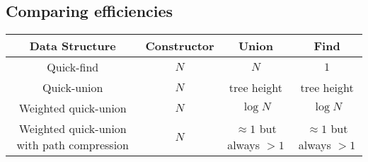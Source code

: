 \documentclass{article}
\begin{document}
\subsection{Comparing efficiencies}
\begin{center}
\begin{tabular}{||c c c c||} 
 \hline
 Data Structure & Constructor & Union & Find \\ [0.5ex] 
 \hline\hline
 Quick-find & $N$ & $N$ & $1$ \\ 
 \hline
 Quick-union & $N$ & tree height & tree height \\
 \hline
 Weighted quick-union & $N$ & $\log{N}$ & $\log{N}$ \\
 \hline
 Weighted quick-union with path compression & $N$ & $\approx{1}$ but always $>1$ & $\approx{1}$ but always $>1$  \\
 \hline
\end{tabular}
\end{center}
\end{document}

